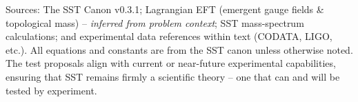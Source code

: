 \documentclass[11pt]{article}
\begin{document}
Sources: The SST Canon v0.3.1; Lagrangian EFT (emergent gauge fields \& topological mass) -- \textit{inferred from problem context}; SST mass-spectrum calculations; and experimental data references within text (CODATA, LIGO, etc.). All equations and constants are from the SST canon unless otherwise noted. The test proposals align with current or near-future experimental capabilities, ensuring that SST remains firmly a scientific theory -- one that can and will be tested by experiment.
\end{document}
